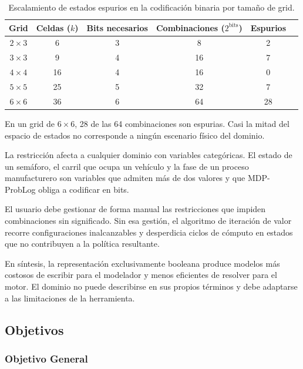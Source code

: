 \begin{table}[H]
    \centering
    \caption{Escalamiento de estados espurios en la codificación binaria por tamaño de grid.}
    \label{tab:escalamiento-espurios}
    \small
    \begin{tabular}{cccccc}
        \toprule
        \textbf{Grid} & \textbf{Celdas ($k$)} & \textbf{Bits necesarios} & \textbf{Combinaciones ($2^{\text{bits}}$)} & \textbf{Espurios} \\
        \midrule
        $2 \times 3$ & 6   & 3 & 8   & 2  \\
        $3 \times 3$ & 9   & 4 & 16  & 7  \\
        $4 \times 4$ & 16  & 4 & 16  & 0  \\
        $5 \times 5$ & 25  & 5 & 32  & 7  \\
        $6 \times 6$ & 36  & 6 & 64  & 28 \\
        \bottomrule
    \end{tabular}
\end{table}

En un grid de $6 \times 6$, 28 de las 64 combinaciones son espurias.
Casi la mitad del espacio de estados no corresponde a ningún escenario
físico del dominio.

La restricción afecta a cualquier dominio con variables categóricas.
El estado de un semáforo, el carril que ocupa un vehículo y la fase
de un proceso manufacturero son variables que admiten más de dos
valores y que MDP-ProbLog obliga a codificar en bits.

El usuario debe gestionar de forma manual las restricciones que impiden
combinaciones sin significado. Sin esa gestión, el algoritmo de
iteración de valor recorre configuraciones inalcanzables y desperdicia
ciclos de cómputo en estados que no contribuyen a la política resultante.

En síntesis, la representación exclusivamente booleana produce modelos
más costosos de escribir para el modelador y menos eficientes de
resolver para el motor. El dominio no puede describirse en sus propios
términos y debe adaptarse a las limitaciones de la herramienta.

\subsection{Objetivos}
\label{sec:objetivos}

\subsubsection{Objetivo General}
\label{subsec:objetivo_general}


